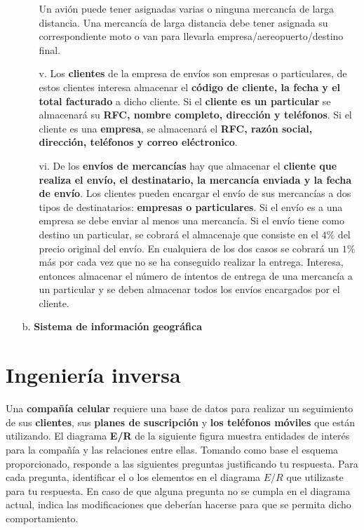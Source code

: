 \documentclass[letterpaper,11pt]{article}
\begin{document}
\begin{itemize}
\begin{itemize}
        Un avión puede tener asignadas varias o ninguna mercancía de larga distancia.
        Una mercancía de larga distancia debe tener asignada su correspondiente moto 
        o van para llevarla empresa/aereopuerto/destino final.
    
        \item[v.] Los \textbf{clientes} de la empresa de envíos son empresas o 
        particulares, de estos clientes interesa almacenar el \textbf{código de 
        cliente, la fecha y el total facturado} a dicho cliente. Si el 
        \textbf{cliente es un particular} se almacenará su \textbf{RFC, nombre 
        completo, dirección y teléfonos}. Si el cliente es una \textbf{empresa}, se 
        almacenará el \textbf{RFC, razón social, dirección, teléfonos y correo 
        eléctronico}.
    
        \item[vi.] De los \textbf{envíos de mercancías} hay que almacenar el 
        \textbf{cliente que realiza el envío, el destinatario, la mercancía
        enviada y la fecha de envío}. Los clientes pueden encargar el envío de 
        sus mercancías a dos tipos de destinatarios: \textbf{empresas o 
        particulares}. Si el envío es a una empresa se debe enviar al menos una 
        mercancía. Si el envío tiene como destino un particular, se cobrará el 
        almacenaje que consiste en el $4 \%$ del precio original del envío. En 
        cualquiera de los dos casos se cobrará un $1 \%$ más por cada vez que no 
        se ha conseguido realizar la entrega. Interesa, entonces almacenar el 
        número de intentos de entrega de una mercancía a un particular y se 
        deben almacenar todos los envíos encargados por el cliente.
    \end{itemize}

    \item[b.] \textbf{Sistema de información geográfica} 
\end{itemize}

\section{Ingeniería inversa}
Una \textbf{compañía celular} requiere una base de datos para realizar un 
seguimiento de sus \textbf{clientes}, sus \textbf{planes de suscripción} y 
\textbf{los teléfonos móviles} que están utilizando. El diagrama \textbf{E/R}
de la siguiente figura muestra entidades de interés para la compañía y las 
relaciones entre ellas. Tomando como base el esquema proporcionado, responde a 
las siguientes preguntas justificando tu respuesta. Para cada pregunta, 
identificar el o los elementos en el diagrama $E/R$ que utilizaste para tu 
respuesta. En caso de que alguna pregunta no se cumpla en el diagrama actual, 
indica las modificaciones que deberían hacerse para que se permita dicho 
comportamiento.
\end{document}
